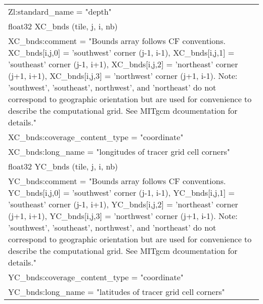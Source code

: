 \begin{longtable}{|p{\textwidth}|}
\rowcolor{Apricot}\hspace{0.5cm}\hspace{0.5cm}Zl:standard\_name = "depth"\\
\rowcolor{Apricot}\hspace{0.5cm}float32 XC\_bnds (tile, j, i, nb)\\
\rowcolor{Apricot}\hspace{0.5cm}\hspace{0.5cm}XC\_bnds:comment = "Bounds array follows CF conventions. XC\_bnds[i,j,0] = 'southwest' corner (j-1, i-1), XC\_bnds[i,j,1] = 'southeast' corner (j-1, i+1), XC\_bnds[i,j,2] = 'northeast' corner (j+1, i+1), XC\_bnds[i,j,3]  = 'northwest' corner (j+1, i-1). Note: 'southwest', 'southeast', northwest', and 'northeast' do not correspond to geographic orientation but are used for convenience to describe the computational grid. See MITgcm dcoumentation for details."\\
\rowcolor{Apricot}\hspace{0.5cm}\hspace{0.5cm}XC\_bnds:coverage\_content\_type = "coordinate"\\
\rowcolor{Apricot}\hspace{0.5cm}\hspace{0.5cm}XC\_bnds:long\_name = "longitudes of tracer grid cell corners"\\
\rowcolor{Apricot}\hspace{0.5cm}float32 YC\_bnds (tile, j, i, nb)\\
\rowcolor{Apricot}\hspace{0.5cm}\hspace{0.5cm}YC\_bnds:comment = "Bounds array follows CF conventions. YC\_bnds[i,j,0] = 'southwest' corner (j-1, i-1), YC\_bnds[i,j,1] = 'southeast' corner (j-1, i+1), YC\_bnds[i,j,2] = 'northeast' corner (j+1, i+1), YC\_bnds[i,j,3]  = 'northwest' corner (j+1, i-1). Note: 'southwest', 'southeast', northwest', and 'northeast' do not correspond to geographic orientation but are used for convenience to describe the computational grid. See MITgcm dcoumentation for details."\\
\rowcolor{Apricot}\hspace{0.5cm}\hspace{0.5cm}YC\_bnds:coverage\_content\_type = "coordinate"\\
\rowcolor{Apricot}\hspace{0.5cm}\hspace{0.5cm}YC\_bnds:long\_name = "latitudes of tracer grid cell corners"\\

\end{longtable}
